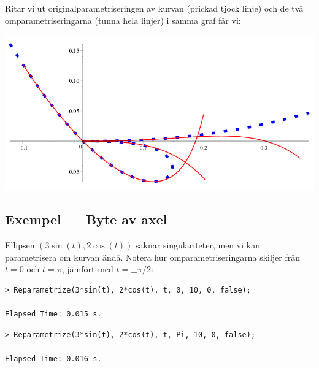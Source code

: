 \vspace{20pt}
Ritar vi ut originalparametriseringen av kurvan (prickad tjock linje) och de två omparametriseringarna (tunna hela linjer) i samma graf får vi:

\begin{center}
\includegraphics[scale=0.35]{Export/kurvorplot2d1.png}
\end{center}

\subsection{Exempel --- Byte av axel}

Ellipsen $\left(3 \sin(t), 2 \cos(t)\right)$ saknar singulariteter, men vi kan parametrisera om kurvan ändå. Notera hur omparametriseringarna skiljer från $t=0$ och $t=\pi$, jämfört med $t=\pm \pi/2$:

\begin{maplegroup}
\begin{verbatim}
> Reparametrize(3*sin(t), 2*cos(t), t, 0, 10, 0, false);

Elapsed Time: 0.015 s.
\end{verbatim}
\mapleresult
\begin{maplelatex}
\end{maplelatex}
\end{maplegroup}

\begin{maplegroup}
\begin{verbatim}
> Reparametrize(3*sin(t), 2*cos(t), t, Pi, 10, 0, false);

Elapsed Time: 0.016 s.
\end{verbatim}
\mapleresult
\begin{maplelatex}
\end{maplelatex}
\end{maplegroup}

